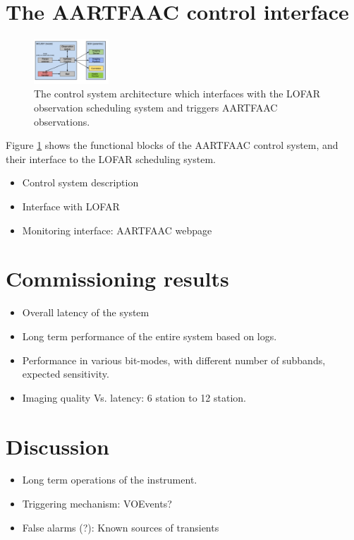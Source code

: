 \documentclass{aa}
\begin{document}
\section {\label{sec:acontrol} The AARTFAAC control interface}
\begin{figure}[htbp]
\centering
\includegraphics[width=0.25\textwidth]{Figs/control_sys.png}
\caption{The  control  system  architecture  which  interfaces  with  the  LOFAR
  observation scheduling system and triggers AARTFAAC observations.}
\label{fig:afaac_ctrl_sys}
\end{figure}
Figure  \ref{fig:afaac_ctrl_sys} shows  the  functional blocks  of the  AARTFAAC
control system, and their interface to the LOFAR scheduling system.
\begin {itemize}
 \item {Control system description}
 \item {Interface with LOFAR}
 \item {Monitoring interface: AARTFAAC webpage}
\end {itemize}

\section {\label{sec:results} Commissioning results}
\begin {itemize}
 \item {Overall latency of the system}
 \item {Long term performance of the entire system based on logs.}
 \item {Performance  in various  bit-modes, with  different number  of subbands,
   expected sensitivity.}
 \item {Imaging quality Vs. latency: 6 station to 12 station.}
\end {itemize}

\section {\label{sec:discussion} Discussion}
\begin {itemize}
 \item {Long term operations of the instrument.}
 \item {Triggering mechanism: VOEvents?}
 \item {False alarms (?): Known sources of transients}
\end {itemize}
\end{document}
